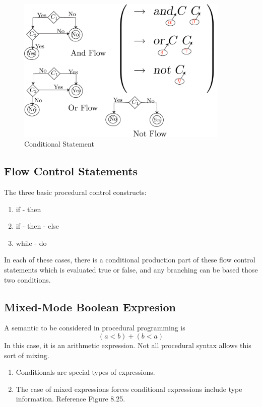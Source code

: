 \documentclass[11pt]{article}
\begin{document}
\begin{figure}[htbp] %
   \centering
   \includegraphics[width=4in]{statementConditional.pdf} 
   \caption{Conditional Statement}
   \label{fig:example}
\end{figure}

\subsection {Flow Control Statements}  
The three basic procedural control constructs:
\begin{enumerate}
\item if - then
\item if - then - else
\item while - do
\end{enumerate}
In each of these cases, there is a conditional production part of these flow control statements which is evaluated true or false, and any branching can be based those two conditions.  

\subsection{Mixed-Mode Boolean Expresion}

A semantic to be considered in procedural programming is 
\[  ( a < b) + (b < a) \]  
In this case, it is an arithmetic expression.    Not all procedural syntax allows this sort of mixing.   
\begin{enumerate}
\item Conditionals are special types of expressions.
\item The case of mixed expressions forces conditional expressions include type information.   Reference Figure 8.25.  
\end{enumerate}
\end{document}
